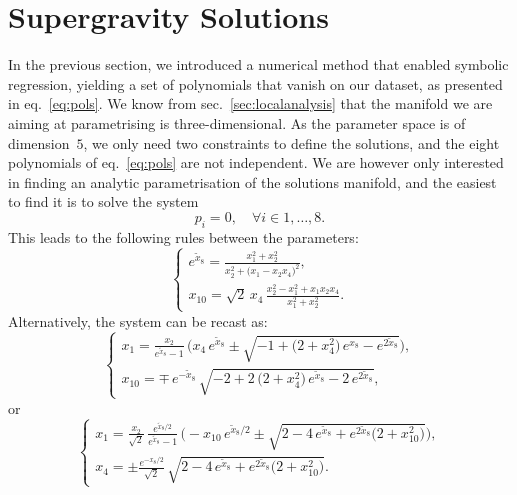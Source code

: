 \documentclass[11pt,a4paper]{article}
\begin{document}
\section{Supergravity Solutions} \label{sec:sugrasol}
In the previous section, we introduced a numerical method that enabled symbolic regression, yielding a set of polynomials that vanish on our dataset, as presented in eq.~\eqref{eq:pols}. We know from sec.~\ref{sec:localanalysis} that the manifold we are aiming at parametrising is three-dimensional. As the parameter space is of dimension~$5$, we only need two constraints to define the solutions, and the eight polynomials of eq.~\eqref{eq:pols} are not independent. We are however only interested in finding an analytic parametrisation of the solutions manifold, and the easiest to find it is to solve the system
	\begin{equation}\label{eq:solvepol}
		p_i = 0, \quad \forall i \in {1,\dots,8}.
	\end{equation}
	This leads to the following rules between the parameters:
	\begin{equation}\label{eq:rulex8x10}
		\begin{cases}
			\displaystyle e^{\tilde{x}_{8}} = \frac{x_{1}^{2}+x_{2}^{2}}{x_{2}^{2} + \big(x_{1}-x_{2}x_{4}\big)^{2}},\\[10pt]
			\displaystyle x_{10} = \sqrt{2}\,x_{4}\,\frac{x_{2}^{2} - x_{1}^{2}+x_{1}x_{2}x_{4}}{x_{1}^{2}+x_{2}^{2}}.
		\end{cases}
	\end{equation}
	Alternatively, the system can be recast as:
	\begin{equation}
		\begin{cases}
			\displaystyle x_{1} = \frac{x_{2}}{e^{\tilde{x}_{8}}-1}\,\Big(x_{4}\,e^{\tilde{x}_{8}} \pm \sqrt{-1+\big(2+x_{4}^{2}\big)\,e^{x_{8}}-e^{2\tilde{x}_{8}}}\Big),\\[8pt]
			\displaystyle x_{10} = \mp\,e^{-\tilde{x}_{8}}\,\sqrt{-2+2\,\big(2+x_{4}^{2}\big)\,e^{\tilde{x}_{8}}-2\,e^{2\tilde{x}_{8}}},
		\end{cases}
	\end{equation}
	or
	\begin{equation}
		\begin{cases}
			\displaystyle x_{1} = \frac{x_{2}}{\sqrt{2}}\,\frac{e^{\tilde{x}_{8}/2}}{e^{\tilde{x}_{8}}-1}\,\Big(-x_{10}\,e^{\tilde{x}_{8}/2} \pm \sqrt{2-4\,e^{\tilde{x}_{8}}+e^{2\tilde{x}_{8}}\big(2+x_{10}^{2}\big)}\Big),\\[8pt]
			\displaystyle x_{4} = \pm \frac{e^{-x_{8}/2}}{\sqrt{2}}\,\sqrt{2-4\,e^{\tilde{x}_{8}}+e^{2\tilde{x}_{8}}\big(2+x_{10}^{2}\big)}.
		\end{cases}
	\end{equation}
\end{document}
